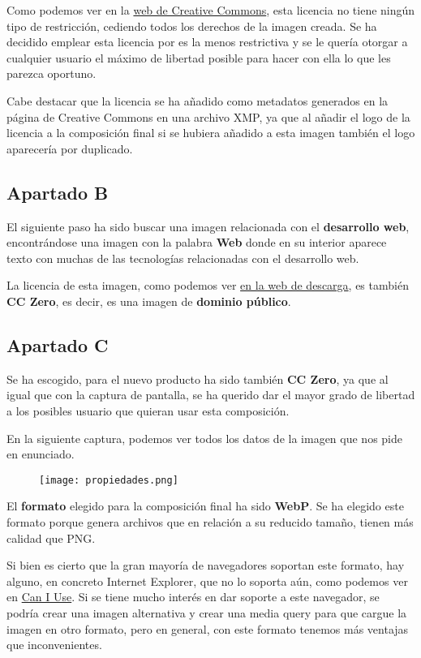 Como podemos ver en la \href{https://creativecommons.org/publicdomain/zero/1.0/deed.es}{web de Creative Commons}, esta licencia no tiene ningún tipo de restricción, cediendo todos los derechos de la imagen creada. Se ha decidido emplear esta licencia por es la menos restrictiva y se le quería otorgar a cualquier usuario el máximo de libertad posible para hacer con ella lo que les parezca oportuno.

Cabe destacar que la licencia se ha añadido como metadatos generados en la página de Creative Commons en una archivo XMP, ya que al añadir el logo de la licencia a la composición final si se hubiera añadido a esta imagen también el logo aparecería por duplicado.

\subsection{Apartado B}
El siguiente paso ha sido buscar una imagen relacionada con el \textbf{desarrollo web}, encontrándose una imagen con la palabra \textbf{Web} donde en su interior aparece texto con muchas de las tecnologías relacionadas con el desarrollo web.

La licencia de esta imagen, como podemos ver \href{https://pxhere.com/es/photo/841903}{en la web de descarga}, es también \textbf{CC Zero}, es decir, es una imagen de \textbf{dominio público}.

\subsection{Apartado C}
Se ha escogido, para el nuevo producto ha sido también \textbf{CC Zero}, ya que al igual que con la captura de pantalla, se ha querido dar el mayor grado de libertad a los posibles usuario que quieran usar esta composición.

En la siguiente captura, podemos ver todos los datos de la imagen que nos pide en enunciado.

\begin{figure}[H]
    \centering
    \texttt{[image: propiedades.png]}
\end{figure}

El \textbf{formato} elegido para la composición final ha sido \textbf{WebP}. Se ha elegido este formato porque genera archivos que en relación a su reducido tamaño, tienen más calidad que PNG.

Si bien es cierto que la gran mayoría de navegadores soportan este formato, hay alguno, en concreto Internet Explorer, que no lo soporta aún, como podemos ver en \href{https://caniuse.com/webp}{Can I Use}. Si se tiene mucho interés en dar soporte a este navegador, se podría crear una imagen alternativa y crear una media query para que cargue la imagen en otro formato, pero en general, con este formato tenemos más ventajas que inconvenientes.

